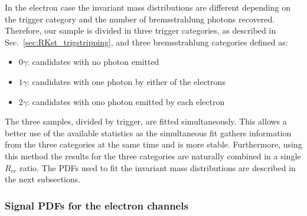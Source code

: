 In the electron case the invariant mass distributions are different depending on the
trigger category and the number of bremsstrahlung photons recovered.
Therefore, our sample is divided in three trigger categories, as described in
Sec.~\ref{sec:RKst_trigstripping}, and three bremsstrahlung categories defined as:
%
\begin{itemize}
\item $0\gamma$: candidates with no photon emitted
\item $1\gamma$: candidates with one photon by either of the electrons
\item $2\gamma$: candidates with ono photon emitted by each electron
\end{itemize}
%
The three samples, divided by trigger, are fitted simultaneously.
This allows a better use of the available statistics as the simultaneous fit
gathers information from the three categories at the same time and is more stable.
Furthermore, using this method the results for the three categories are
naturally combined in a single $R_{ee}$ ratio.
%
The PDFs used to fit the invariant mass distributions are described in the next subsections.



\subsubsection{Signal PDFs for the electron channels}
\label{sec:fit_ee_central}

